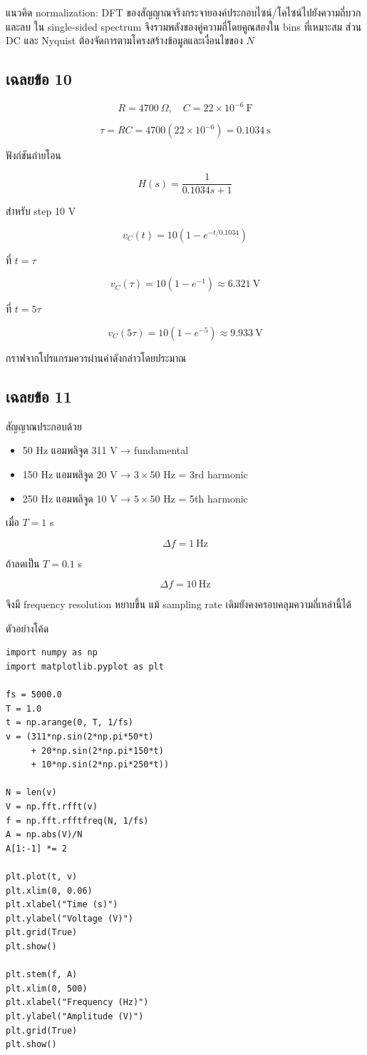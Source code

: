 แนวคิด normalization: DFT ของสัญญาณจริงกระจายองค์ประกอบไซน์/โคไซน์ไปยังความถี่บวกและลบ ใน single-sided spectrum จึงรวมพลังของคู่ความถี่โดยคูณสองใน bins ที่เหมาะสม ส่วน DC และ Nyquist ต้องจัดการตามโครงสร้างข้อมูลและเงื่อนไขของ $N$

\subsection{เฉลยข้อ 10}

\[
R=4700\ \Omega,\quad C=22\times10^{-6}\ \text{F}
\]

\[
\tau=RC=4700(22\times10^{-6})=0.1034\ \text{s}
\]

ฟังก์ชันถ่ายโอน

\[
H(s)=\frac{1}{0.1034s+1}
\]

สำหรับ step 10 V

\[
v_C(t)=10\left(1-e^{-t/0.1034}\right)
\]

ที่ $t=\tau$

\[
v_C(\tau)=10(1-e^{-1})\approx6.321\ \text{V}
\]

ที่ $t=5\tau$

\[
v_C(5\tau)=10(1-e^{-5})\approx9.933\ \text{V}
\]

กราฟจากโปรแกรมควรผ่านค่าดังกล่าวโดยประมาณ

\subsection{เฉลยข้อ 11}

สัญญาณประกอบด้วย

\begin{itemize}
    \item 50 Hz แอมพลิจูด 311 V → fundamental
    \item 150 Hz แอมพลิจูด 20 V → $3\times50$ Hz = 3rd harmonic
    \item 250 Hz แอมพลิจูด 10 V → $5\times50$ Hz = 5th harmonic
\end{itemize}

เมื่อ $T=1$ s

\[
\Delta f=1\ \text{Hz}
\]

ถ้าลดเป็น $T=0.1$ s

\[
\Delta f=10\ \text{Hz}
\]

จึงมี frequency resolution หยาบขึ้น แม้ sampling rate เดิมยังคงครอบคลุมความถี่เหล่านี้ได้

ตัวอย่างโค้ด

\begin{verbatim}
import numpy as np
import matplotlib.pyplot as plt

fs = 5000.0
T = 1.0
t = np.arange(0, T, 1/fs)
v = (311*np.sin(2*np.pi*50*t)
     + 20*np.sin(2*np.pi*150*t)
     + 10*np.sin(2*np.pi*250*t))

N = len(v)
V = np.fft.rfft(v)
f = np.fft.rfftfreq(N, 1/fs)
A = np.abs(V)/N
A[1:-1] *= 2

plt.plot(t, v)
plt.xlim(0, 0.06)
plt.xlabel("Time (s)")
plt.ylabel("Voltage (V)")
plt.grid(True)
plt.show()

plt.stem(f, A)
plt.xlim(0, 500)
plt.xlabel("Frequency (Hz)")
plt.ylabel("Amplitude (V)")
plt.grid(True)
plt.show()
\end{verbatim}

